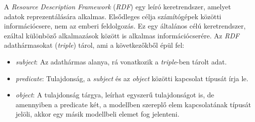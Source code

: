 A \emph{Resource Description Framework} (\emph{RDF}) egy leíró keretrendszer, amelyet adatok reprezentálására alkalmas\cite{Wood:14:RCA}. Elsődleges célja számítógépek közötti információcsere, nem az emberi feldolgozás. Ez egy általános célú keretrendszer, ezáltal különböző alkalmazások között is alkalmas információcserére. Az \emph{RDF} adathármasokat (\emph{triple}) tárol, ami a következőkből épül fel:
\begin{itemize}
	\item \emph{subject}: Az adathármas alanya, rá vonatkozik a \emph{triple}-ben tárolt adat.
	\item \emph{predicate}: Tulajdonság, a \emph{subject} és az \emph{object} közötti kapcsolat típusát írja le.
	\item \emph{object}: A tulajdonság tárgya, leírhat egyszerű tulajdonságot is, de amennyiben a predicate két, a modellben szereplő elem kapcsolatának típusát jelöli, akkor egy másik modellbeli elemet fog jelenteni.
\end{itemize}

